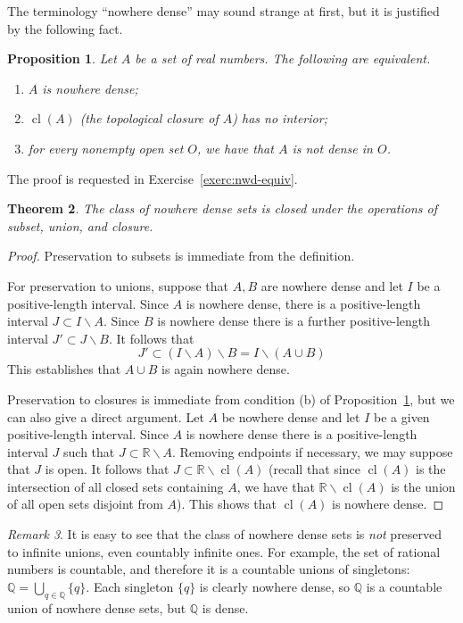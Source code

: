 \documentclass[11pt,oneside]{amsbook}
\newcommand{\QQ}{\mathbb Q}
\newcommand{\RR}{\mathbb R}
\DeclareMathOperator{\cl}{cl}
\theoremstyle{definition}
\theoremstyle{plain}
\newtheorem{thm}{Theorem}[section]
\newtheorem{prop}[thm]{Proposition}
\theoremstyle{definition}
\theoremstyle{remark}
\newtheorem{rem}[thm]{Remark}
\numberwithin{equation}{section}
\numberwithin{figure}{section}
\begin{document}
The terminology ``nowhere dense'' may sound strange at first, but it is justified by the following fact.

\begin{prop}
  \label{prop:nwd-equiv}
  Let $A$ be a set of real numbers. The following are equivalent.
\begin{enumerate}
\item $A$ is nowhere dense;
\item $\cl(A)$ (the topological closure of $A$) has no interior;
\item for every nonempty open set $O$, we have that $A$ is not dense in $O$.
\end{enumerate}
\end{prop}

The proof is requested in Exercise~\ref{exerc:nwd-equiv}.

\begin{thm}
  The class of nowhere dense sets is closed under the operations of subset, union, and closure.
\end{thm}

\begin{proof}
  Preservation to subsets is immediate from the definition.

  For preservation to unions, suppose that $A,B$ are nowhere dense and let $I$ be a positive-length interval. Since $A$ is nowhere dense, there is a positive-length interval $J\subset I\smallsetminus A$. Since $B$ is nowhere dense there is a further positive-length interval $J'\subset J\smallsetminus B$. It follows that
\[J'\subset (I\smallsetminus A)\smallsetminus B=I\smallsetminus (A\cup B)
\]
This establishes that $A\cup B$ is again nowhere dense.

Preservation to closures is immediate from condition (b) of Proposition~\ref{prop:nwd-equiv}, but we can also give a direct argument. Let $A$ be nowhere dense and let $I$ be a given positive-length interval. Since $A$ is nowhere dense there is a positive-length interval $J$ such that $J\subset\RR\smallsetminus A$. Removing endpoints if necessary, we may suppose that $J$ is open. It follows that $J\subset\RR\smallsetminus\cl(A)$ (recall that since $\cl(A)$ is the intersection of all closed sets containing $A$, we have that $\RR\smallsetminus\cl(A)$ is the union of all open sets disjoint from $A$). This shows that $\cl(A)$ is nowhere dense.
\end{proof}

\begin{rem}
  It is easy to see that the class of nowhere dense sets is \emph{not} preserved to infinite unions, even countably infinite ones. For example, the set of rational numbers is countable, and therefore it is a countable unions of singletons: $\QQ=\bigcup_{q\in\QQ}\{q\}$. Each singleton $\{q\}$ is clearly nowhere dense, so $\QQ$ is a countable union of nowhere dense sets, but $\QQ$ is dense.
\end{rem}
\end{document}
